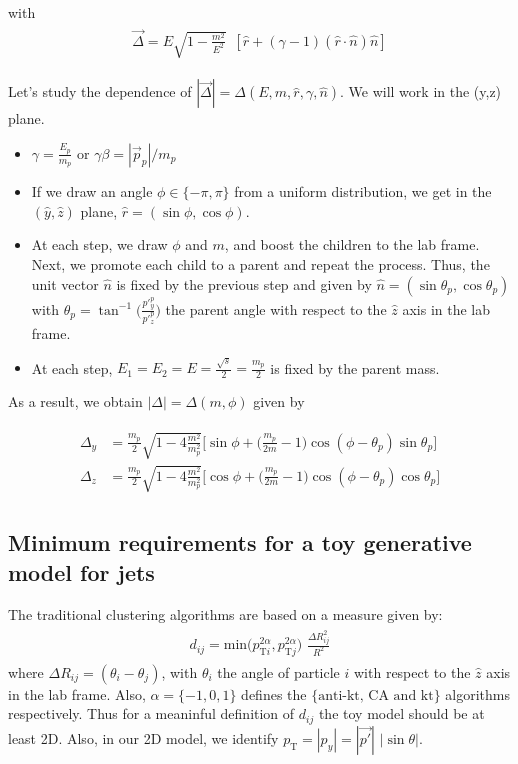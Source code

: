 \documentclass[12pt]{article}
\newcommand{\bea}{\begin{eqnarray}\begin{aligned}}
\newcommand{\eea}{\end{aligned}\end{eqnarray}}
\begin{document}
with
\bea\label{eq:delta}
 \vec{\Delta}   = E \sqrt{1-\frac{m^2}{E^2}} \,\,\,[ \hat{r} + (\gamma -1) (\hat{r} \cdot \hat{n}) \hat{n} ] 
\eea

Let's study the dependence of $|\vec{\Delta}|=\Delta(E,m,\hat{r},\gamma,\hat{n})$. We will work in the (y,z) plane.

\begin{itemize}
\item $\gamma=\frac{E_p}{m_p}$ or $\gamma \beta = |\vec{p}_p|/m_p$
\item If we draw an angle $\phi \in \{-\pi,\pi\}$ from a uniform distribution, we get in the $(\hat{y},\hat{z})$ plane,  $\hat{r}= (\sin{\phi}, \cos{\phi})$.

\item At each step, we draw $\phi$ and $m$, and boost the children to the lab frame. Next, we promote each child to a parent and repeat the process. Thus, the unit vector $\hat{n}$ is fixed by the previous step and given by $\hat{n}=(\sin{\theta_p}, \cos{\theta_p})$ with $\theta_p=\tan^{-1}\bigg({\frac{p'^{p}_y}{p'^{p}_z}}\bigg)$ the parent angle with respect to the $\hat{z}$ axis in the lab frame. 

\item At each step, $E_1=E_2=E =\frac{\sqrt{s}}{2}= \frac{m_p}{2}$ is fixed by the parent mass.

\end{itemize}

As a result, we obtain $|\Delta|=\Delta(m,\phi)$ given by

\bea
 \Delta_y   &= \frac{m_p}{2} \sqrt{1- 4\frac{m^2}{m_p^2}}  \bigg[ \sin{\phi} + \bigg(\frac{m_p}{ 2 m}-1\bigg) \cos{(\phi-\theta_p)} \sin{\theta_p} \bigg]\\ 
  \Delta_z   &= \frac{m_p}{2} \sqrt{1- 4\frac{m^2}{m_p^2}}   \bigg[\cos{\phi} +  \bigg(\frac{m_p}{2 m}-1\bigg) \cos{(\phi-\theta_p)} \cos{\theta_p} \bigg]
\eea




\subsection{Minimum requirements for a toy generative model for jets}

The traditional clustering algorithms are based on a measure given by:
\bea
d_{ij}= \text{min}({p_{\text{T}i}^{2\alpha}, {p_{\text{T}j}^{2\alpha}})\,\, \frac{\Delta R_{ij}^2}{R^2}}
\eea
where $\Delta R_{ij}=(\theta_i-\theta_j)$, with $\theta_i$ the angle of particle $i$ with respect to the $\hat{z}$ axis in the lab frame. Also, $\alpha=\{-1,0,1\}$ defines the $\{\text{anti-kt, CA and kt}\}$ algorithms respectively. Thus for a meaninful definition of $d_{ij}$ the toy model should be at least 2D. Also, in our 2D model, we identify $p_{\text{T}}=|p_y| = |\vec{p'}| \,\,  |\sin{\theta}|$.
\end{document}
